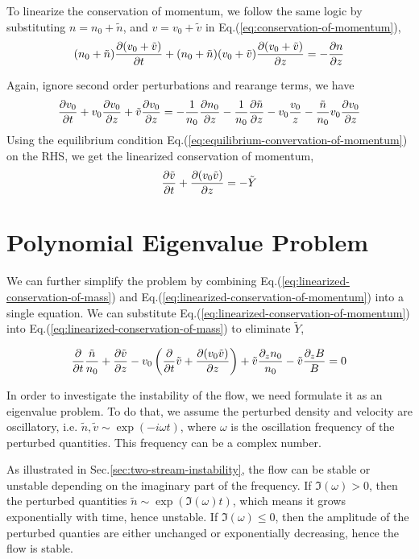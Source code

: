 To linearize the conservation of momentum, we follow the same logic by substituting $n=n_0+\tilde{n}$, and $v=v_0+\tilde{v}$ in Eq.(\ref{eq:conservation-of-momentum}),
\[ (n_0+\tilde{n})\pdv{(v_0+\tilde{v})}{t} + (n_0+\tilde{n})(v_0+\tilde{v})\pdv{(v_0+\tilde{v})}{z} = -\pdv{n}{z} \]

Again, ignore second order perturbations and rearange terms, we have
\[ \pdv{v_0}{t} + v_0\pdv{v_0}{z} + \tilde{v}\pdv{v_0}{z} 
= -\frac{1}{n_0}\pdv{n_0}{z} -\frac{1}{n_0}\pdv{\tilde{n}}{z} -v_0\frac{v_0}{z} - \frac{\tilde{n}}{n_0}v_0\pdv{v_0}{z} \]
Using the equilibrium condition Eq.(\ref{eq:equilibrium-convervation-of-momentum}) on the RHS, we get the linearized conservation of momentum,
\begin{equation} \label{eq:linearized-conservation-of-momentum}
	\pdv{\tilde{v}}{t} + \pdv{(v_0\tilde{v})}{z} = -\tilde{Y}	
\end{equation}

\section{Polynomial Eigenvalue Problem}
We can further simplify the problem by combining Eq.(\ref{eq:linearized-conservation-of-mass}) and Eq.(\ref{eq:linearized-conservation-of-momentum}) into a single equation. We can substitute Eq.(\ref{eq:linearized-conservation-of-momentum}) into Eq.(\ref{eq:linearized-conservation-of-mass}) to eliminate $\tilde{Y}$,

\begin{equation} \label{eq:single-governing-equation}
	\pdv{t}\frac{\tilde{n}}{n_0} 
	+ \pdv{\tilde{v}}{z} - v_0\left(\pdv{t}\tilde{v} 
	+ \pdv{(v_0\tilde{v})}{z}\right) 
	+ \tilde{v}\frac{\partial_z n_0}{n_0} 
	- \tilde{v}\frac{\partial_z B}{B} 
	= 0
\end{equation}

In order to investigate the instability of the flow, we need formulate it as an eigenvalue problem. To do that, we assume the perturbed density and velocity are oscillatory, i.e. $\tilde{n}, \tilde{v} \sim \exp(-i\omega t)$, where $\omega$ is the oscillation frequency of the perturbed quantities. This frequency can be a complex number. 

As illustrated in Sec.\ref{sec:two-stream-instability}, the flow can be stable or unstable depending on the imaginary part of the frequency. If $\Im(\omega) > 0$, then the perturbed quantities $\tilde{n} \sim \exp(\Im(\omega) t)$, which means it grows exponentially with time, hence unstable. If $\Im(\omega) \leq 0$, then the amplitude of the perturbed quanties are either unchanged or exponentially decreasing, hence the flow is stable.

